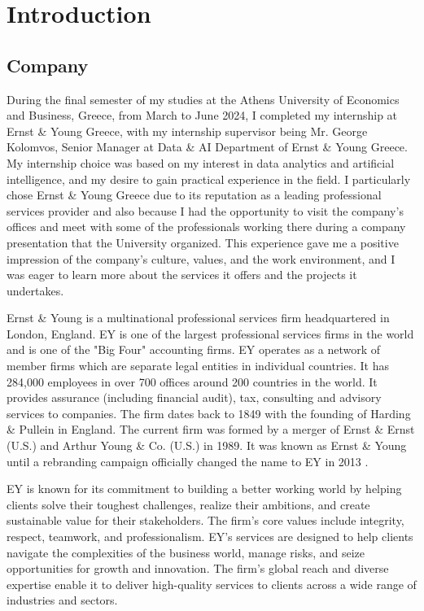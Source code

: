 \chapter{Introduction}
\label{ch:internship-intro}

\section{Company}

During the final semester of my studies at the Athens University of Economics
and Business, Greece, from March to June 2024, I completed my internship at
Ernst \& Young Greece, with my internship supervisor being Mr. George Kolomvos,
Senior Manager at Data \& AI Department of Ernst \& Young Greece. My internship
choice was based on my interest in data analytics and artificial intelligence,
and my desire to gain practical experience in the field. I particularly chose
Ernst \& Young Greece due to its reputation as a leading professional services
provider and also because I had the opportunity to visit the company's offices
and meet with some of the professionals working there during a company
presentation that the University organized. This experience gave me a positive
impression of the company's culture, values, and the work environment, and I
was eager to learn more about the services it offers and the projects it
undertakes.

Ernst \& Young is a multinational professional services firm headquartered in
London, England. EY is one of the largest professional services firms in the
world and is one of the "Big Four" accounting firms. EY operates as a network
of member firms which are separate legal entities in individual countries. It
has 284,000 employees in over 700 offices around 200 countries in the world. It
provides assurance (including financial audit), tax, consulting and advisory
services to companies. The firm dates back to 1849 with the founding of Harding
\& Pullein in England. The current firm was formed by a merger of Ernst \&
Ernst (U.S.) and Arthur Young \& Co. (U.S.) in 1989. It was known as Ernst \&
Young until a rebranding campaign officially changed the name to EY in 2013
\cite{Ey}.

EY is known for its commitment to building a better working world by helping
clients solve their toughest challenges, realize their ambitions, and create
sustainable value for their stakeholders. The firm's core values include
integrity, respect, teamwork, and professionalism. EY's services are designed
to help clients navigate the complexities of the business world, manage risks,
and seize opportunities for growth and innovation. The firm's global reach and
diverse expertise enable it to deliver high-quality services to clients across
a wide range of industries and sectors.


